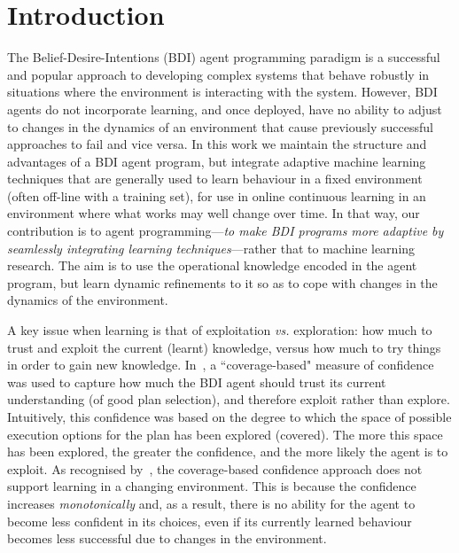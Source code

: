 \section{Introduction}\label{sec:introduction}


The Belief-Desire-Intentions (BDI) agent programming paradigm
\cite{WooldridgeBook,BusettaRHL:AL99-JACK,Pokahr:EXP03-JADEX,jasonbook} is a
successful and popular approach to developing complex systems that
behave robustly in situations where the environment is
interacting with the system.
However, BDI agents do not incorporate learning, and once deployed,
have no ability to adjust to changes in the dynamics of an environment
that cause previously successful approaches to fail and vice versa.
In this work we maintain the structure and advantages of a BDI agent
program, but integrate adaptive machine
learning techniques that are generally used to learn behaviour in a
fixed environment (often off-line with a training set),
for use in online continuous learning in an environment where what
works may well change over time.
In that way, our contribution is to agent programming---\emph{to make BDI programs more adaptive by seamlessly integrating learning techniques}---rather that to machine learning research.
The aim is to use the operational knowledge encoded in the agent program, but learn dynamic refinements to it so as to cope with changes in the dynamics of the environment. 

A key issue when learning is that of exploitation \emph{vs.} exploration: how much to trust and exploit the current
(learnt) knowledge, versus how much to try things in order to gain new
knowledge. 
In~\cite{singh10:extending,singh10:learning}, a
``coverage-based" measure of confidence was used to capture how much
the BDI agent should trust its current understanding (of good plan
selection), and therefore exploit rather than explore. Intuitively,
this confidence was based on the degree to which the space of possible
execution options for the plan has been explored (covered).
The more this space has been explored, the
greater the confidence, and the more likely the agent is
to exploit.   
%
As recognised by~\cite{singh10:learning}, the coverage-based
confidence approach does not support learning in a changing
environment. This is because the confidence increases
\emph{monotonically} and, as a result, there is no ability for the
agent to become less confident in its choices, even if its currently
learned behaviour becomes less successful due to changes in the
environment. 

